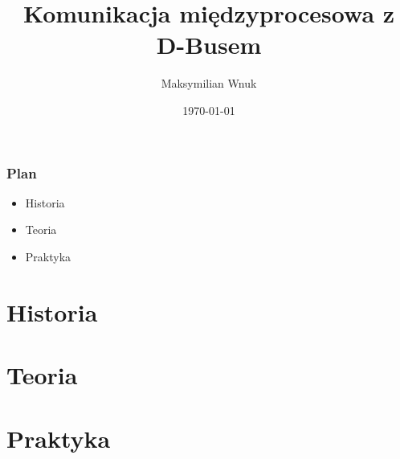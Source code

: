 \documentclass{beamer}
\title{Komunikacja międzyprocesowa z D-Busem}
\author{Maksymilian Wnuk}
\date{\today}
\begin{document}
\begin{frame}
    \titlepage
\end{frame} 

\begin{frame}
\frametitle{Plan}
\begin{itemize}
    \item Historia
    \item Teoria
    \item Praktyka
\end{itemize}
\end{frame}

\section{Historia}


\section{Teoria}


\section{Praktyka}



\end{document}
